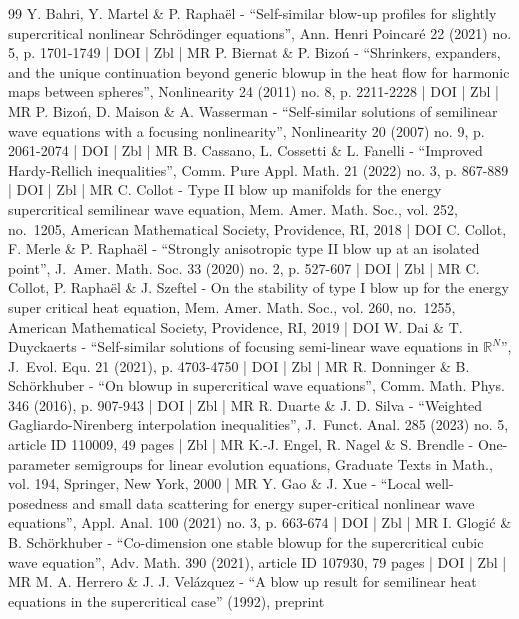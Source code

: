 \documentclass[10pt]{amsart}
\theoremstyle{plain}
\theoremstyle{definition}
\begin{document}
\begin{thebibliography}{99}
Y. Bahri, Y. Martel \& P. Raphaël - “Self-similar blow-up profiles for slightly supercritical nonlinear Schrödinger equations”, Ann. Henri Poincaré 22 (2021) no. 5, p. 1701-1749 | DOI | Zbl | MR
P. Biernat \& P. Bizoń - “Shrinkers, expanders, and the unique continuation beyond generic blowup in the heat flow for harmonic maps between spheres”, Nonlinearity 24 (2011) no. 8, p. 2211-2228 | DOI | Zbl | MR
P. Bizoń, D. Maison \& A. Wasserman - “Self-similar solutions of semilinear wave equations with a focusing nonlinearity”, Nonlinearity 20 (2007) no. 9, p. 2061-2074 | DOI | Zbl | MR
B. Cassano, L. Cossetti \& L. Fanelli - “Improved Hardy-Rellich inequalities”, Comm. Pure Appl. Math. 21 (2022) no. 3, p. 867-889 | DOI | Zbl | MR
C. Collot - Type II blow up manifolds for the energy supercritical semilinear wave equation, Mem. Amer. Math. Soc., vol. 252, no. 1205, American Mathematical Society, Providence, RI, 2018 | DOI
C. Collot, F. Merle \& P. Raphaël - “Strongly anisotropic type II blow up at an isolated point”, J. Amer. Math. Soc. 33 (2020) no. 2, p. 527-607 | DOI | Zbl | MR
C. Collot, P. Raphaël \& J. Szeftel - On the stability of type I blow up for the energy super critical heat equation, Mem. Amer. Math. Soc., vol. 260, no. 1255, American Mathematical Society, Providence, RI, 2019 | DOI
W. Dai \& T. Duyckaerts - “Self-similar solutions of focusing semi-linear wave equations in $\mathbb{R}^N$”, J. Evol. Equ. 21 (2021), p. 4703-4750 | DOI | Zbl | MR
R. Donninger \& B. Schörkhuber - “On blowup in supercritical wave equations”, Comm. Math. Phys. 346 (2016), p. 907-943 | DOI | Zbl | MR
R. Duarte \& J. D. Silva - “Weighted Gagliardo-Nirenberg interpolation inequalities”, J. Funct. Anal. 285 (2023) no. 5, article ID 110009, 49 pages | Zbl | MR
K.-J. Engel, R. Nagel \& S. Brendle - One-parameter semigroups for linear evolution equations, Graduate Texts in Math., vol. 194, Springer, New York, 2000 | MR
Y. Gao \& J. Xue - “Local well-posedness and small data scattering for energy super-critical nonlinear wave equations”, Appl. Anal. 100 (2021) no. 3, p. 663-674 | DOI | Zbl | MR
I. Glogić \& B. Schörkhuber - “Co-dimension one stable blowup for the supercritical cubic wave equation”, Adv. Math. 390 (2021), article ID 107930, 79 pages | DOI | Zbl | MR
M. A. Herrero \& J. J. Velázquez - “A blow up result for semilinear heat equations in the supercritical case” (1992), preprint

\end{thebibliography}
\end{document}
